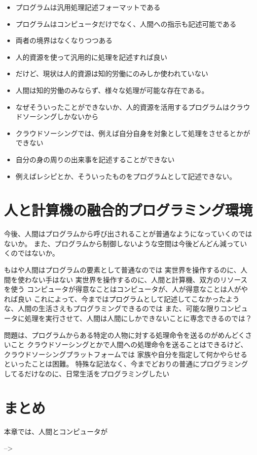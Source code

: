 \begin{itemize}
\itemsep1pt\parskip0pt
\item
  プログラムは汎用処理記述フォーマットである
\item
  プログラムはコンピュータだけでなく、人間への指示も記述可能である
\item
  両者の境界はなくなりつつある
\item
  人的資源を使って汎用的に処理を記述すれば良い
\item
  だけど、現状は人的資源は知的労働にのみしか使われていない
\item
  人間は知的労働のみならず、様々な処理が可能な存在である。
\item
  なぜそういったことができないか、人的資源を活用するプログラムはクラウドソーシングしかないから
\item
  クラウドソーシングでは、例えば自分自身を対象として処理をさせるとかができない
\item
  自分の身の周りの出来事を記述することができない
\item
  例えばレシピとか、そういったものをプログラムとして記述できない。
\end{itemize}

\section{人と計算機の融合的プログラミング環境}\label{ux4ebaux3068ux8a08ux7b97ux6a5fux306eux878dux5408ux7684ux30d7ux30edux30b0ux30e9ux30dfux30f3ux30b0ux74b0ux5883}

今後、人間はプログラムから呼び出されることが普通なようになっていくのではないか。
また、プログラムから制御しないような空間は今後どんどん減っていくのではないか。

もはや人間はプログラムの要素として普通なのでは
実世界を操作するのに、人間を使わない手はない
実世界を操作するのに、人間と計算機、双方のリソースを使う
コンピュータが得意なことはコンピュータが、人が得意なことは人がやれば良い
これによって、今まではプログラムとして記述してこなかったような、人間の生活さえもプログラミングできるのでは
また、可能な限りコンピュータに処理を実行させて、人間は人間にしかできないことに専念できるのでは？

問題は、プログラムからある特定の人物に対する処理命令を送るのがめんどくさいこと
クラウドソーシングとかで人間への処理命令を送ることはできるけど、クラウドソーシングプラットフォームでは
家族や自分を指定して何かやらせるといったことは困難。
特殊な記法なく、今までどおりの普通にプログラミングしてるだけなのに、日常生活をプログラミングしたい

\section{まとめ}\label{ux307eux3068ux3081}

本章では、人間とコンピュータが

--\textgreater{}
